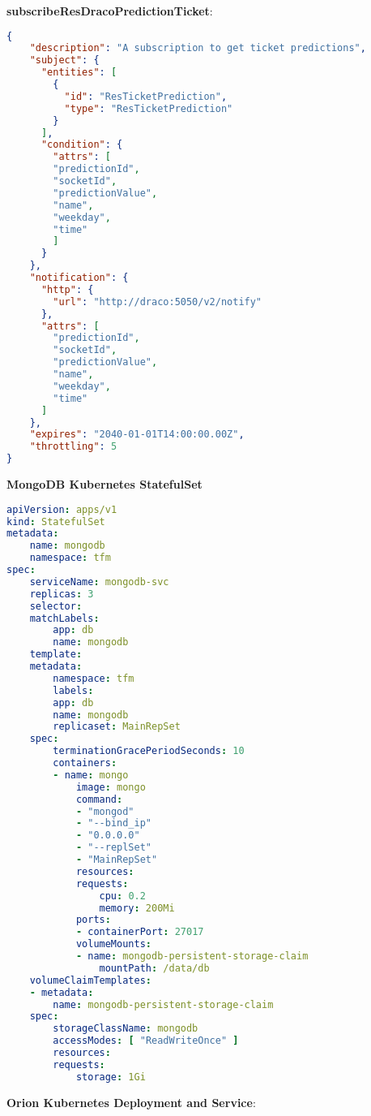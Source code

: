 \textbf{subscribeResDracoPredictionTicket}:

\begin{lstlisting}[language=json, caption=Definition file for the Orion subscription that will trigger Draco por processing., label=subscribeResDracoPredictionTicket]
{
    "description": "A subscription to get ticket predictions",
    "subject": {
      "entities": [
        {
          "id": "ResTicketPrediction",
          "type": "ResTicketPrediction"
        }
      ],
      "condition": {
        "attrs": [
        "predictionId",
        "socketId",
        "predictionValue",
        "name",
        "weekday",
        "time"
        ]
      }
    },
    "notification": {
      "http": {
        "url": "http://draco:5050/v2/notify"
      },
      "attrs": [
        "predictionId",
        "socketId",
        "predictionValue",
        "name",
        "weekday",
        "time"
      ]
    },
    "expires": "2040-01-01T14:00:00.00Z",
    "throttling": 5
}
\end{lstlisting}

\textbf{MongoDB Kubernetes StatefulSet}

\begin{lstlisting}[language=yaml,caption=Kubernetes YAML definition file for MongoDB StatefulSet Deployment, label=MongoKubernetes]
apiVersion: apps/v1
kind: StatefulSet
metadata:
    name: mongodb
    namespace: tfm
spec:
    serviceName: mongodb-svc
    replicas: 3
    selector:
    matchLabels:
        app: db
        name: mongodb
    template:
    metadata:
        namespace: tfm
        labels:
        app: db
        name: mongodb
        replicaset: MainRepSet
    spec:
        terminationGracePeriodSeconds: 10
        containers:
        - name: mongo
            image: mongo
            command:
            - "mongod"
            - "--bind_ip"
            - "0.0.0.0"
            - "--replSet"
            - "MainRepSet"
            resources:
            requests:
                cpu: 0.2
                memory: 200Mi
            ports:
            - containerPort: 27017
            volumeMounts:
            - name: mongodb-persistent-storage-claim
                mountPath: /data/db
    volumeClaimTemplates:
    - metadata:
        name: mongodb-persistent-storage-claim
    spec:
        storageClassName: mongodb
        accessModes: [ "ReadWriteOnce" ]
        resources:
        requests:
            storage: 1Gi
\end{lstlisting}

\textbf{Orion Kubernetes Deployment and Service}:

